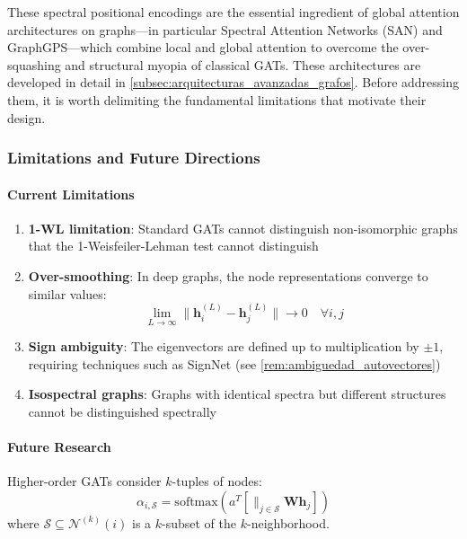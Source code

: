 These spectral positional encodings are the essential ingredient of global attention architectures on graphs---in particular Spectral Attention Networks (SAN) and GraphGPS---which combine local and global attention to overcome the over-squashing and structural myopia of classical \glspl{GAT}. These architectures are developed in detail in \autoref{subsec:arquitecturas_avanzadas_grafos}. Before addressing them, it is worth delimiting the fundamental limitations that motivate their design.

\subsubsection{Limitations and Future Directions}\label{subsubsec:limitaciones_gat}

\paragraph{Current Limitations}

\begin{enumerate}
    \item \textbf{1-WL limitation}: Standard GATs cannot distinguish non-isomorphic graphs that the 1-Weisfeiler-Lehman test cannot distinguish

    \item \textbf{Over-smoothing}: In deep graphs, the node representations converge to similar values:
    \begin{equation}
        \lim_{L \to \infty} \|\mathbf{h}_i^{(L)} - \mathbf{h}_j^{(L)}\| \to 0 \quad \forall i,j
        \label{eq:over_smoothing_limit}
    \end{equation}

    \item \textbf{Sign ambiguity}: The eigenvectors are defined up to multiplication by $\pm 1$, requiring techniques such as SignNet (see \autoref{rem:ambiguedad_autovectores})

    \item \textbf{Isospectral graphs}: Graphs with identical spectra but different structures cannot be distinguished spectrally
\end{enumerate}

\paragraph{Future Research}

\begin{definition}\label{def:higher_order_gat}
Higher-order GATs consider $k$-tuples of nodes:
\begin{equation}
    \alpha_{i,\mathcal{S}} = \text{softmax}\left(a^T\left[\|_{j \in \mathcal{S}} \mathbf{W}\mathbf{h}_j\right]\right)
    \label{eq:higher_order_gat}
\end{equation}
where $\mathcal{S} \subseteq \mathcal{N}^{(k)}(i)$ is a $k$-subset of the $k$-neighborhood.
\end{definition}

